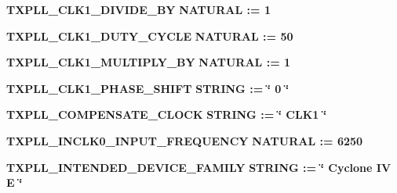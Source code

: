 \begin{DoxyCompactItemize}
{\bf T\+X\+P\+L\+L\+\_\+\+C\+L\+K1\+\_\+\+D\+I\+V\+I\+D\+E\+\_\+\+BY} {\bfseries {\bfseries \textcolor{comment}{N\+A\+T\+U\+R\+AL}\textcolor{vhdlchar}{ }\textcolor{vhdlchar}{ }\textcolor{vhdlchar}{\+:}\textcolor{vhdlchar}{=}\textcolor{vhdlchar}{ }\textcolor{vhdlchar}{ } \textcolor{vhdldigit}{1} \textcolor{vhdlchar}{ }}}
\item 
{\bf T\+X\+P\+L\+L\+\_\+\+C\+L\+K1\+\_\+\+D\+U\+T\+Y\+\_\+\+C\+Y\+C\+LE} {\bfseries {\bfseries \textcolor{comment}{N\+A\+T\+U\+R\+AL}\textcolor{vhdlchar}{ }\textcolor{vhdlchar}{ }\textcolor{vhdlchar}{\+:}\textcolor{vhdlchar}{=}\textcolor{vhdlchar}{ }\textcolor{vhdlchar}{ } \textcolor{vhdldigit}{50} \textcolor{vhdlchar}{ }}}
\item 
{\bf T\+X\+P\+L\+L\+\_\+\+C\+L\+K1\+\_\+\+M\+U\+L\+T\+I\+P\+L\+Y\+\_\+\+BY} {\bfseries {\bfseries \textcolor{comment}{N\+A\+T\+U\+R\+AL}\textcolor{vhdlchar}{ }\textcolor{vhdlchar}{ }\textcolor{vhdlchar}{\+:}\textcolor{vhdlchar}{=}\textcolor{vhdlchar}{ }\textcolor{vhdlchar}{ } \textcolor{vhdldigit}{1} \textcolor{vhdlchar}{ }}}
\item 
{\bf T\+X\+P\+L\+L\+\_\+\+C\+L\+K1\+\_\+\+P\+H\+A\+S\+E\+\_\+\+S\+H\+I\+FT} {\bfseries {\bfseries \textcolor{comment}{S\+T\+R\+I\+NG}\textcolor{vhdlchar}{ }\textcolor{vhdlchar}{ }\textcolor{vhdlchar}{\+:}\textcolor{vhdlchar}{=}\textcolor{vhdlchar}{ }\textcolor{vhdlchar}{ }\textcolor{vhdlchar}{ }\textcolor{vhdlchar}{ }\textcolor{keyword}{\char`\"{} 0 \char`\"{}}\textcolor{vhdlchar}{ }}}
\item 
{\bf T\+X\+P\+L\+L\+\_\+\+C\+O\+M\+P\+E\+N\+S\+A\+T\+E\+\_\+\+C\+L\+O\+CK} {\bfseries {\bfseries \textcolor{comment}{S\+T\+R\+I\+NG}\textcolor{vhdlchar}{ }\textcolor{vhdlchar}{ }\textcolor{vhdlchar}{\+:}\textcolor{vhdlchar}{=}\textcolor{vhdlchar}{ }\textcolor{vhdlchar}{ }\textcolor{vhdlchar}{ }\textcolor{vhdlchar}{ }\textcolor{keyword}{\char`\"{} C\+L\+K1 \char`\"{}}\textcolor{vhdlchar}{ }}}
\item 
{\bf T\+X\+P\+L\+L\+\_\+\+I\+N\+C\+L\+K0\+\_\+\+I\+N\+P\+U\+T\+\_\+\+F\+R\+E\+Q\+U\+E\+N\+CY} {\bfseries {\bfseries \textcolor{comment}{N\+A\+T\+U\+R\+AL}\textcolor{vhdlchar}{ }\textcolor{vhdlchar}{ }\textcolor{vhdlchar}{\+:}\textcolor{vhdlchar}{=}\textcolor{vhdlchar}{ }\textcolor{vhdlchar}{ } \textcolor{vhdldigit}{6250} \textcolor{vhdlchar}{ }}}
\item 
{\bf T\+X\+P\+L\+L\+\_\+\+I\+N\+T\+E\+N\+D\+E\+D\+\_\+\+D\+E\+V\+I\+C\+E\+\_\+\+F\+A\+M\+I\+LY} {\bfseries {\bfseries \textcolor{comment}{S\+T\+R\+I\+NG}\textcolor{vhdlchar}{ }\textcolor{vhdlchar}{ }\textcolor{vhdlchar}{\+:}\textcolor{vhdlchar}{=}\textcolor{vhdlchar}{ }\textcolor{vhdlchar}{ }\textcolor{vhdlchar}{ }\textcolor{vhdlchar}{ }\textcolor{keyword}{\char`\"{} Cyclone I\+V E \char`\"{}}\textcolor{vhdlchar}{ }}}

\end{DoxyCompactItemize}

